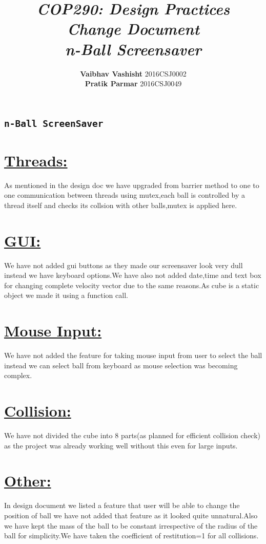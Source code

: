 \documentclass[14pt]{extarticle}
\author{\textbf{Vaibhav Vashisht} 2016CSJ0002  \\\textbf{Pratik Parmar} 2016CSJ0049}
\title{\textbf{\textit{COP290: Design Practices}\\ \textit{Change Document} \\ \textit{n-Ball Screensaver}  }}
\begin{document}
\maketitle
\newpage

\begin{center}

\section*{\texttt{n-Ball ScreenSaver}
}
\end{center}
\section{\underline{Threads:}}
As mentioned in the design doc we have upgraded from barrier method to one to one communication between threads using mutex,each ball is controlled by a thread itself and checks its collsion with other balls,mutex is applied here.
\section{\underline{GUI:}}
We have not added gui buttons as they made our screensaver look very dull instead we have keyboard options.We have also not added date,time and text box for changing complete velocity vector due to the same reasons.As cube is a static object we made it using a function call.
\section{\underline{Mouse Input:}}
We have not added the feature for taking mouse input from user to select the ball instead we can select ball from keyboard as mouse selection was becoming complex.
\section{\underline{Collision:}}

We have not divided the cube into 8 parts(as planned for efficient collision check) as the project was already working well without this even for large inputs.
\section{\underline{Other:}}

In design document we listed a feature that user will be able to change the position of ball we have not added that feature as it looked quite unnatural.Also we have kept the mass of the ball to be constant irrespective of the radius of the ball for simplicity.We have taken the coefficient of restitution=1 for all collisions. 
\end{document}
